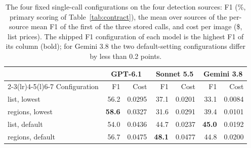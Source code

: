 \begin{table}[H]
\centering\footnotesize\setlength{\tabcolsep}{4pt}
\caption{The four fixed single-call configurations on the four detection sources: F1 (\%, primary scoring of Table~\ref{tab:contract}), the mean over sources of the per-source mean F1 of the first of the three stored calls, and cost per image (\$, list prices). The shipped F1 configuration of each model is the highest F1 of its column (bold); for Gemini 3.8 the two default-setting configurations differ by less than 0.2 points.}\label{tab:config_menu}
\begin{tabular}{@{}lrrrrrr@{}}\toprule
 & \multicolumn{2}{c}{GPT-6.1} & \multicolumn{2}{c}{Sonnet 5.5} & \multicolumn{2}{c}{Gemini 3.8} \\\cmidrule(lr){2-3}\cmidrule(lr){4-5}\cmidrule(l){6-7}
Configuration & F1 & Cost & F1 & Cost & F1 & Cost \\\midrule
list, lowest & 56.2 & 0.0295 & 37.1 & 0.0201 & 33.1 & 0.0084 \\
regions, lowest & \textbf{58.6} & 0.0327 & 31.6 & 0.0291 & 39.4 & 0.0101 \\
list, default & 54.0 & 0.0436 & 44.7 & 0.0237 & \textbf{45.0} & 0.0192 \\
regions, default & 56.7 & 0.0475 & \textbf{48.1} & 0.0477 & 44.8 & 0.0200 \\
\bottomrule\end{tabular}
\end{table}

